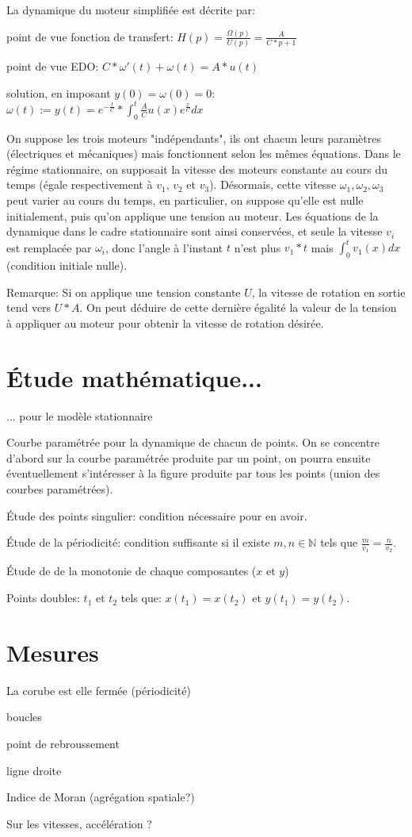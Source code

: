 \documentclass[11pt,a4paper]{article}
\newcommand{\N}{\mathbb N}%
\begin{document}
La dynamique du moteur simplifiée est décrite par:

point de vue fonction de transfert:
$ H(p) = \frac{\Omega(p)}{U(p)} = \frac{A}{C*p+1}$

point de vue EDO:
$C * \omega'(t) + \omega(t) = A*u(t)$


solution, en imposant $y(0) = \omega(0) = 0$: $\omega(t) := y(t) = e^{-\frac{t}{C}} * \int_0^t \frac{A}{C} u(x) e^{\frac{x}{C}} dx $


On suppose les trois moteurs "indépendants", ils ont chacun leurs paramètres (électriques et mécaniques) mais fonctionnent selon les mêmes équations.
Dans le régime stationnaire, on supposait la vitesse des moteurs constante au cours du temps (égale  respectivement à $v_1$, $v_2$ et $v_3$). Désormais, cette vitesse $\omega_1, \omega_2, \omega_3$ peut varier au cours du temps, en particulier, on suppose qu'elle est nulle initialement, puis qu'on applique une tension au moteur. Les équations de la dynamique dans le cadre stationnaire sont ainsi conservées, et seule la vitesse $v_i$ est remplacée par $\omega_i$, donc l'angle à l'instant $t$ n'est plus $v_1 *t$ mais $ \int_0^t v_1(x)dx$ (condition initiale nulle).

Remarque: Si on applique une tension constante $U$, la vitesse de rotation en sortie tend vers $U*A$. On peut déduire de cette dernière égalité la valeur de la tension à appliquer au moteur pour obtenir la vitesse de rotation désirée.




\section{Étude mathématique...}
... pour le modèle stationnaire

Courbe paramétrée pour la dynamique de chacun de points. On se concentre d'abord sur la courbe paramétrée produite par un point, on pourra ensuite éventuellement s'intéresser à la figure produite par tous les points (union des courbes paramétrées).

Étude des points singulier: condition nécessaire pour en avoir.

Étude de la périodicité: condition suffisante si il existe $m,n \in \N$ tels que $ \frac{m}{v_1}= \frac{n}{v_2}$. 

Étude de de la monotonie de chaque composantes ($x$ et $y$) 

Points doubles: $t_1$ et $t_2$ tels que: $x(t_1)=x(t_2)$ et $y(t_1) = y(t_2)$.



\section{Mesures}
La corube est elle fermée (périodicité)

boucles

point de rebroussement

ligne droite

Indice de Moran (agrégation spatiale?)

Sur les vitesses, accélération ?




 
\end{document}
